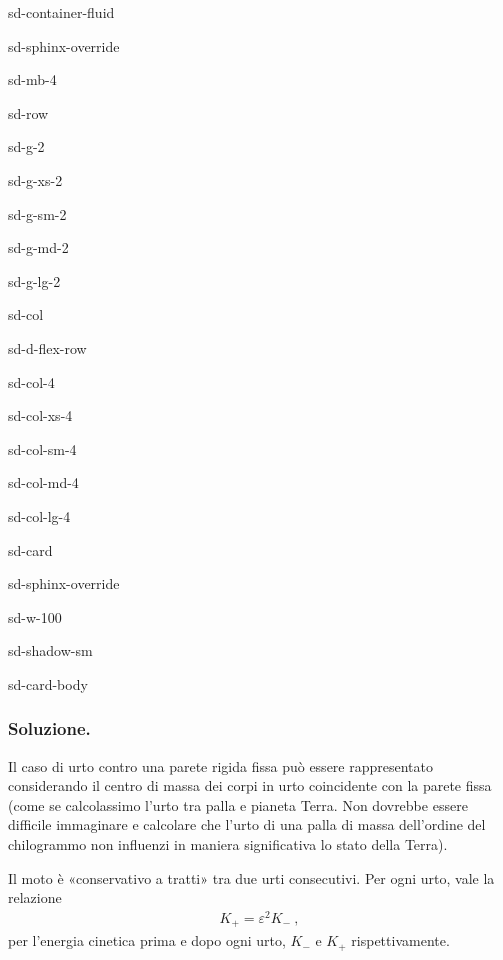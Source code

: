 \documentclass[letterpaper,10pt,italian]{jupyterBook}
\begin{document}
\begin{sphinxuseclass}{sd-container-fluid}
\begin{sphinxuseclass}{sd-sphinx-override}
\begin{sphinxuseclass}{sd-mb-4}
\begin{sphinxuseclass}{sd-row}
\begin{sphinxuseclass}{sd-g-2}
\begin{sphinxuseclass}{sd-g-xs-2}
\begin{sphinxuseclass}{sd-g-sm-2}
\begin{sphinxuseclass}{sd-g-md-2}
\begin{sphinxuseclass}{sd-g-lg-2}
\begin{sphinxuseclass}{sd-col}
\begin{sphinxuseclass}{sd-d-flex-row}
\begin{sphinxuseclass}{sd-col-4}
\begin{sphinxuseclass}{sd-col-xs-4}
\begin{sphinxuseclass}{sd-col-sm-4}
\begin{sphinxuseclass}{sd-col-md-4}
\begin{sphinxuseclass}{sd-col-lg-4}
\begin{sphinxuseclass}{sd-card}
\begin{sphinxuseclass}{sd-sphinx-override}
\begin{sphinxuseclass}{sd-w-100}
\begin{sphinxuseclass}{sd-shadow-sm}
\begin{sphinxuseclass}{sd-card-body}
\end{sphinxuseclass}
\end{sphinxuseclass}
\end{sphinxuseclass}
\end{sphinxuseclass}
\end{sphinxuseclass}
\end{sphinxuseclass}
\end{sphinxuseclass}
\end{sphinxuseclass}
\end{sphinxuseclass}
\end{sphinxuseclass}
\end{sphinxuseclass}
\end{sphinxuseclass}
\end{sphinxuseclass}
\end{sphinxuseclass}
\end{sphinxuseclass}
\end{sphinxuseclass}
\end{sphinxuseclass}
\end{sphinxuseclass}
\end{sphinxuseclass}
\end{sphinxuseclass}
\end{sphinxuseclass}\subsubsection*{Soluzione.}

\sphinxAtStartPar
Il caso di urto contro una parete rigida fissa può essere rappresentato considerando il centro di massa dei corpi in urto coincidente con la parete fissa (come se calcolassimo l’urto tra palla e pianeta Terra. Non dovrebbe essere difficile immaginare \sphinxhyphen{} e calcolare \sphinxhyphen{} che l’urto di una palla di massa dell’ordine del chilogrammo non influenzi in maniera significativa lo stato della Terra).

\sphinxAtStartPar
Il moto è «conservativo a tratti» tra due urti consecutivi. Per ogni urto, vale la relazione
\begin{equation*}
\begin{split}K_+ = \varepsilon^2 K_- \ ,\end{split}
\end{equation*}
\sphinxAtStartPar
per l’energia cinetica prima e dopo ogni urto, \(K_-\) e \(K_+\) rispettivamente.
\end{document}
